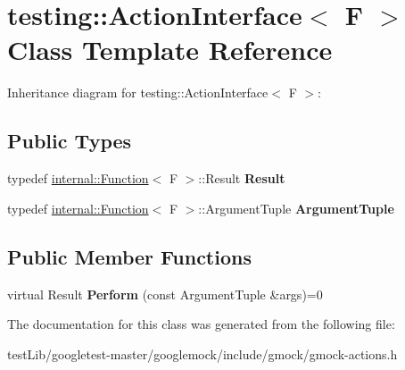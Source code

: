 \hypertarget{classtesting_1_1ActionInterface}{}\section{testing\+:\+:Action\+Interface$<$ F $>$ Class Template Reference}
\label{classtesting_1_1ActionInterface}


Inheritance diagram for testing\+:\+:Action\+Interface$<$ F $>$\+:
\subsection*{Public Types}
\begin{DoxyCompactItemize}
\item 
\mbox{\label{classtesting_1_1ActionInterface_a7477de2fe3e4e01c59db698203acaee7}} 
typedef \hyperlink{structtesting_1_1internal_1_1Function}{internal\+::\+Function}$<$ F $>$\+::Result {\bfseries Result}
\item 
\mbox{\label{classtesting_1_1ActionInterface_af72720d864da4d606629e83edc003511}} 
typedef \hyperlink{structtesting_1_1internal_1_1Function}{internal\+::\+Function}$<$ F $>$\+::Argument\+Tuple {\bfseries Argument\+Tuple}
\end{DoxyCompactItemize}
\subsection*{Public Member Functions}
\begin{DoxyCompactItemize}
\item 
\mbox{\label{classtesting_1_1ActionInterface_a20f8624fcea1786f2992b358760422a0}} 
virtual Result {\bfseries Perform} (const Argument\+Tuple \&args)=0
\end{DoxyCompactItemize}


The documentation for this class was generated from the following file\+:\begin{DoxyCompactItemize}
\item 
test\+Lib/googletest-\/master/googlemock/include/gmock/gmock-\/actions.\+h\end{DoxyCompactItemize}
